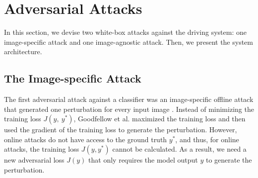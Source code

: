 
\section{Adversarial Attacks} 

In this section, we devise two white-box attacks against the driving system: one image-specific attack and one image-agnostic attack. Then, we present the system architecture.

\subsection{The Image-specific Attack}

The first adversarial attack against a classifier was an image-specific offline attack that generated one perturbation for every input image \citep{goodfellow2014explaining}. Instead of minimizing the training loss $J(y,\ y^{*})$, Goodfellow et al. maximized the training loss and then used the gradient of the training loss to generate the perturbation. However, online attacks do not have access to the ground truth $y^{*}$, and thus, for online attacks, the training loss $J(y, y^{*})$ cannot be calculated. As a result, we need a new adversarial loss $J(y)$ that only requires the model output $y$ to generate the perturbation.

